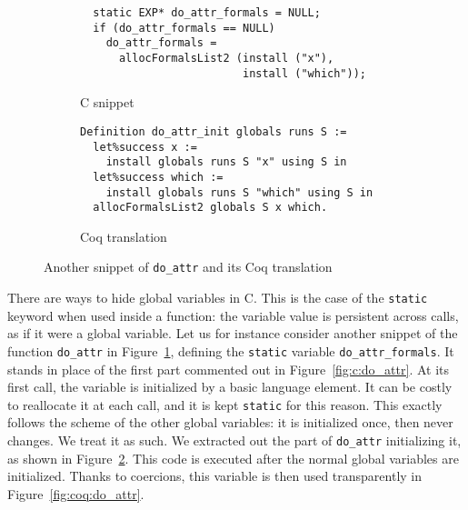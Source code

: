 \documentclass[
    sigplan,
    10pt,
    review, %
    natbib=false %
 ]{acmart}
\begin{document}
\begin{figure*}
    \centering{}
\begin{subfigure}{.5\textwidth}
\begin{verbatim}
  static EXP* do_attr_formals = NULL;
  if (do_attr_formals == NULL)
    do_attr_formals =
      allocFormalsList2 (install ("x"),
                         install ("which"));
\end{verbatim}
    \caption{C snippet}
    \label{fig:c:do_attr:formals}
\end{subfigure}
\begin{subfigure}{.49\textwidth}
\begin{verbatim}
Definition do_attr_init globals runs S :=
  let%success x :=
    install globals runs S "x" using S in
  let%success which :=
    install globals runs S "which" using S in
  allocFormalsList2 globals S x which.
\end{verbatim}
    \caption{Coq translation}
    \label{fig:coq:do_attr:formals}
\end{subfigure}
    \caption{Another snippet of \texttt{do_attr} and its Coq translation}
    \label{fig:do_attr:formals}
\end{figure*}

There are ways to hide global variables in C.
This is the case of the \texttt{static} keyword
when used inside a function:
the variable value is persistent across calls,
as if it were a global variable.
Let us for instance consider another snippet of the function
\texttt{do_attr} in Figure~\ref{fig:c:do_attr:formals},
defining the \texttt{static} variable \texttt{do_attr_formals}.
It stands in place of the first part commented out in Figure~\ref{fig:c:do_attr}.
At its first call, the variable is initialized by a basic language element.
It can be costly to reallocate it at each call,
and it is kept \texttt{static} for this reason.
%
This exactly follows the scheme of the other global variables:
it is initialized once, then never changes.
We treat it as such.
We extracted out the part of \texttt{do_attr}
initializing it, as shown in Figure~\ref{fig:coq:do_attr:formals}.
This code is executed after the normal global variables are initialized.
Thanks to coercions,
this variable is then used transparently in Figure~\ref{fig:coq:do_attr}.
\end{document}
